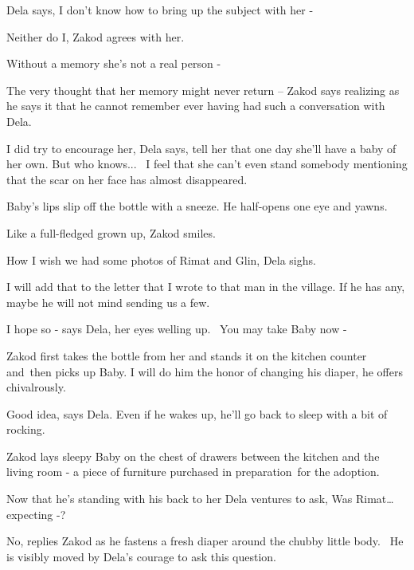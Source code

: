 \documentclass[twoside,11pt]{book}
\begin{document}
Dela says, {\textquotedbl}I don't know how to bring up the subject with her -{\textquotedbl} 

{\textquotedbl}Neither do I,{\textquotedbl} Zakod agrees with her.

{\textquotedbl}Without a memory she's not a real person -{\textquotedbl} 

{\textquotedbl}The very thought that her memory might never return -- {\textquotedbl} Zakod says realizing as he says it
that he cannot remember ever having had such a conversation with Dela. 

{\textquotedbl}I did try to encourage her,{\textquotedbl} Dela says, {\textquotedbl}tell her that one day she'll have a
baby of her own. But who knows...~ I feel that she can't even stand somebody mentioning that the scar on her face has
almost disappeared.{\textquotedbl}

Baby's lips slip off the bottle with a sneeze. He half-opens one eye and yawns. 

{\textquotedbl}Like a full-fledged grown up,{\textquotedbl} Zakod smiles. 

{\textquotedbl}How I wish we had some photos of Rimat and Glin,{\textquotedbl} Dela sighs.

{\textquotedbl}I will add that to the letter that I wrote to that man in the village. If he has any, maybe he will not
mind sending us a few.{\textquotedbl} 

{\textquotedbl}I hope so -{\textquotedbl} says Dela, her eyes welling up. ~{\textquotedbl}You may take Baby now
-{\textquotedbl} 

Zakod first takes the bottle from her and stands it on the kitchen counter and\ then picks up Baby. {\textquotedbl}I
will do him the honor of changing his diaper,{\textquotedbl} he offers chivalrously.~

{\textquotedbl}Good idea,{\textquotedbl} says Dela. {\textquotedbl}Even if he wakes up, he'll go back to sleep with a
bit of rocking.{\textquotedbl} 

Zakod lays sleepy Baby on the chest of drawers between the kitchen and the living room - a piece of furniture purchased
in preparation~for the adoption.

Now that he's standing with his back to her Dela ventures to ask, {\textquotedbl}Was Rimat{\dots} expecting
-?{\textquotedbl}\ 

{\textquotedbl}No,{\textquotedbl} replies Zakod as he fastens a fresh diaper around the chubby little body.~ He is
visibly moved by Dela's courage to ask this question.
\end{document}
